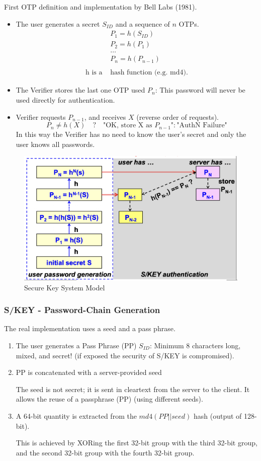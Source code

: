 First OTP definition and implementation by Bell Labs (1981). 
\begin{itemize}
    \item The user generates a secret $S_{ID}$ and a sequence of $n$ OTPs.
    \[
        \begin{aligned}
            &P_1 = h(S_{ID}) \\
            &P_2 = h(P_1) \\
            &\dots \\
            &P_n = h(P_{n-1})\\\\
            \text{h is a } &\text{hash } \text{function (e.g. md4).}
        \end{aligned}
    \]
    \item The Verifier stores the last one OTP used $P_n$: This password will never be used directly for authentication.
    \item Verifier requests $P_{n-1}$, and receives $X$ (reverse order of requests).
    \[
        P_n \ne h(X)\quad ?\quad \text{"OK, store X as } P_{n-1}\text{"} : \text{"AuthN Failure"}
    \]
    In this way the Verifier has no need to know the user's secret and only the user knows all passwords.
\end{itemize}

\begin{figure}[H]
    \centering
    \includegraphics[width=0.5\linewidth]{Images/Authentication/skey.png}
    \caption{Secure Key System Model}
\end{figure}

\subsubsection*{S/KEY - Password-Chain Generation}
\begin{center}
    The real implementation uses a seed and a pass phrase.
\end{center}
\begin{enumerate}
    \item The user generates a Pass Phrase (PP) $S_{ID}$: Minimum 8 characters long, mixed, and secret! (if exposed the security of S/KEY is compromised).
    \item PP is concatenated with a server-provided seed 
    
    The seed is not secret; it is sent in cleartext from the server to the client. It allows the reuse of a passphrase (PP) (using different seeds).
    \item A 64-bit quantity is extracted from the $md4(PP||seed)$ hash (output of 128-bit).
    
    This is achieved by XORing the first 32-bit group with the third 32-bit group, and the second 32-bit group with the fourth 32-bit group.
\end{enumerate}

